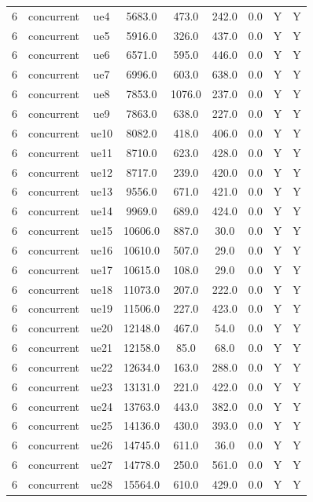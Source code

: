 \begin{table}[ht]
\begin{tabular}{|c|c|c|c|c|c|c|c|c|}
6 & concurrent & ue4 & 5683.0 & 473.0 & 242.0 & 0.0 & Y & Y \\
6 & concurrent & ue5 & 5916.0 & 326.0 & 437.0 & 0.0 & Y & Y \\
6 & concurrent & ue6 & 6571.0 & 595.0 & 446.0 & 0.0 & Y & Y \\
6 & concurrent & ue7 & 6996.0 & 603.0 & 638.0 & 0.0 & Y & Y \\
6 & concurrent & ue8 & 7853.0 & 1076.0 & 237.0 & 0.0 & Y & Y \\
6 & concurrent & ue9 & 7863.0 & 638.0 & 227.0 & 0.0 & Y & Y \\
6 & concurrent & ue10 & 8082.0 & 418.0 & 406.0 & 0.0 & Y & Y \\
6 & concurrent & ue11 & 8710.0 & 623.0 & 428.0 & 0.0 & Y & Y \\
6 & concurrent & ue12 & 8717.0 & 239.0 & 420.0 & 0.0 & Y & Y \\
6 & concurrent & ue13 & 9556.0 & 671.0 & 421.0 & 0.0 & Y & Y \\
6 & concurrent & ue14 & 9969.0 & 689.0 & 424.0 & 0.0 & Y & Y \\
6 & concurrent & ue15 & 10606.0 & 887.0 & 30.0 & 0.0 & Y & Y \\
6 & concurrent & ue16 & 10610.0 & 507.0 & 29.0 & 0.0 & Y & Y \\
6 & concurrent & ue17 & 10615.0 & 108.0 & 29.0 & 0.0 & Y & Y \\
6 & concurrent & ue18 & 11073.0 & 207.0 & 222.0 & 0.0 & Y & Y \\
6 & concurrent & ue19 & 11506.0 & 227.0 & 423.0 & 0.0 & Y & Y \\
6 & concurrent & ue20 & 12148.0 & 467.0 & 54.0 & 0.0 & Y & Y \\
6 & concurrent & ue21 & 12158.0 & 85.0 & 68.0 & 0.0 & Y & Y \\
6 & concurrent & ue22 & 12634.0 & 163.0 & 288.0 & 0.0 & Y & Y \\
6 & concurrent & ue23 & 13131.0 & 221.0 & 422.0 & 0.0 & Y & Y \\
6 & concurrent & ue24 & 13763.0 & 443.0 & 382.0 & 0.0 & Y & Y \\
6 & concurrent & ue25 & 14136.0 & 430.0 & 393.0 & 0.0 & Y & Y \\
6 & concurrent & ue26 & 14745.0 & 611.0 & 36.0 & 0.0 & Y & Y \\
6 & concurrent & ue27 & 14778.0 & 250.0 & 561.0 & 0.0 & Y & Y \\
6 & concurrent & ue28 & 15564.0 & 610.0 & 429.0 & 0.0 & Y & Y \\

\end{tabular}
\end{table}
